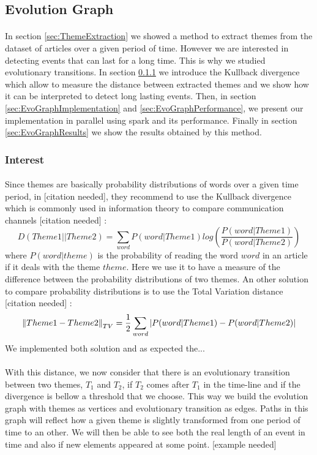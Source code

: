 \subsection{Evolution Graph}
\paragraph{}
In section \ref{sec:ThemeExtraction} we showed a method to extract themes from the dataset of articles over a given period of time. However we are interested in detecting events that can last for a long time. This is why we studied evolutionary transitions. In section \ref{sec:EvoGraphInterest} we introduce the Kullback divergence which allow to measure the distance between extracted themes and we show how it can be interpreted to detect long lasting events. Then, in section \ref{sec:EvoGraphImplementation} and \ref{sec:EvoGraphPerformance}, we present our implementation in parallel using spark and its performance. Finally in section \ref{sec:EvoGraphResults} we show the results obtained by this method.

\subsubsection{Interest}
\label{sec:EvoGraphInterest}

\paragraph{}
Since themes are basically probability distributions of words over a given time period, in [citation needed], they recommend to use the Kullback divergence which is commonly used in information theory to compare communication channels [citation needed] :\[ D(Theme1 || Theme2) = \sum_{word} P(word|Theme1) log(\frac{P(word|Theme1)}{P(word|Theme2)})\]where $P(word|theme)$ is the probability of reading the word $word$ in an article if it deals with the theme $theme$. Here we use it to have a measure of the difference between the probability distributions of two themes. An other solution to compare probability distributions is to use the Total Variation distance [citation needed] :\[ \left\lVert Theme1 - Theme2\right\rVert_{TV} = \frac{1}{2} \sum_{word} |P(word|Theme1) - P(word|Theme2)|\]We implemented both solution and as expected the...

\paragraph{}
With this distance, we now consider that there is an evolutionary transition between two themes, $T_1$ and $T_2$, if $T_2$ comes after $T_1$ in the time-line and if the divergence is bellow a threshold that we choose. This way we build the evolution graph with themes as vertices and evolutionary transition as edges. Paths in this graph will reflect how a given theme is slightly transformed from one period of time to an other. We will then be able to see both the real length of an event in time and also if new elements appeared at some point. [example needed]

